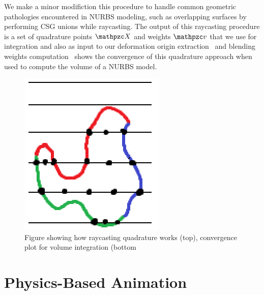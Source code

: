 
We make a minor modifiction this procedure to handle common geometric pathologies encountered in NURBS modeling, such as overlapping surfaces by performing 
CSG unions while raycasting. 
The output of this raycasting procedure is a set of quadrature points $\st{X}$ and weights $\st{v}$ that we use for integration and also as input to our 
deformation origin extraction~ and blending weights computation~
 shows the convergence of this quadrature approach when used to compute the volume of a NURBS model.
\begin{figure}
    \includegraphics[width=\columnwidth]{figures/raycasting_quadrature}
    \caption{Figure showing how raycasting quadrature works (top), convergence plot for volume integration (bottom}
    \label{fig:raycasting}
\end{figure}

\section{Physics-Based Animation}


